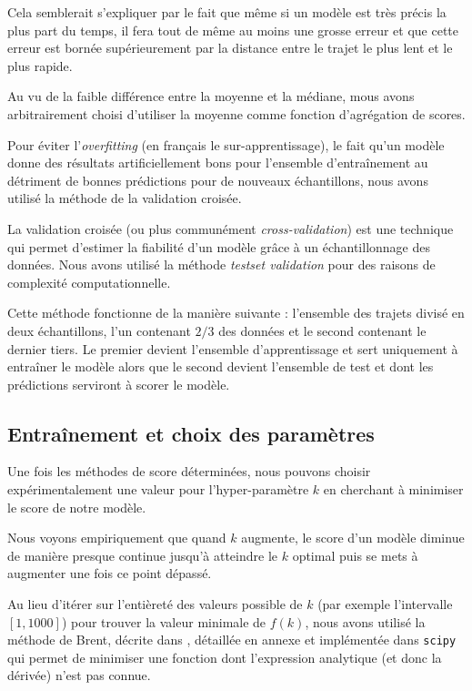 \documentclass[letterpaper]{article}
\begin{document}
Cela semblerait s'expliquer par le fait que même si un modèle est très précis la plus part du temps, il fera tout de même au moins une grosse erreur et que cette erreur est bornée supérieurement par la distance entre le trajet le plus lent et le plus rapide.

Au vu de la faible différence entre la moyenne et la médiane, mous avons arbitrairement choisi d'utiliser la moyenne comme fonction d'agrégation de scores.

Pour éviter l'\textit{overfitting} (en français le sur-apprentissage), le fait qu'un modèle donne des résultats artificiellement bons pour l'ensemble d’entraînement au détriment de bonnes prédictions pour de nouveaux échantillons, nous avons utilisé la méthode de la validation croisée.

La validation croisée (ou plus communément \textit{cross-validation}) est une technique qui permet d'estimer la fiabilité d'un modèle grâce à un échantillonnage des données. Nous avons utilisé la méthode \textit{testset validation} pour des raisons de complexité computationnelle.

Cette méthode fonctionne de la manière suivante : l'ensemble des trajets divisé en deux échantillons, l'un contenant $2/3$ des données et le second contenant le dernier tiers. Le premier devient l'ensemble d'apprentissage et sert uniquement à entraîner le modèle alors que le second devient l'ensemble de test et dont les prédictions serviront à scorer le modèle.

\subsection{Entraînement et choix des paramètres}

Une fois les méthodes de score déterminées, nous pouvons choisir expérimentalement une valeur pour l'hyper-paramètre $k$ en cherchant à minimiser le score de notre modèle.

Nous voyons empiriquement que quand $k$ augmente, le score d'un modèle diminue de manière presque continue jusqu'à atteindre le $k$ optimal puis se mets à augmenter une fois ce point dépassé.

Au lieu d'itérer sur l'entièreté des valeurs possible de $k$ (par exemple l’intervalle $[1,1000]$) pour trouver la valeur minimale de $f(k)$, nous avons utilisé la méthode de Brent, décrite dans \cite{rivlin1973algorithms}, détaillée en annexe et implémentée dans \texttt{scipy} qui permet de minimiser une fonction dont l'expression analytique (et donc la dérivée) n'est pas connue.
\end{document}
